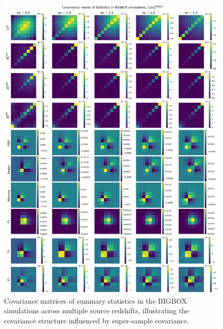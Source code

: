 \begin{figure}[p]
    \centering
    \includegraphics[width=\textwidth]{figures/results/cov_bigbox.png}
    \caption[Covariance Matrices of summary statistics in BIGBOX Simulations]{Covariance matrices of summary statistics in the BIGBOX simulations across multiple source redshifts, illustrating the covariance structure influenced by super-sample covariance.}
    \label{fig:cov_bigbox}
\end{figure}

